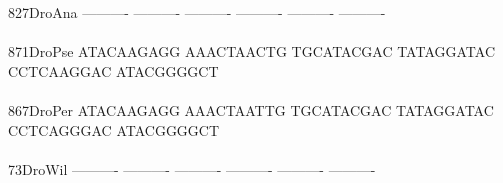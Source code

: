 \documentclass[11pt,twoside,reqno,a4paper]{article}
\begin{document}
{827\hspace*{2\charwidth}DroAna	----------	----------	----------	----------	----------	----------	\\
\hspace*{5\charwidth}\hspace*{7\charwidth}\hspace*{1\charwidth}\hspace*{1\charwidth}\hspace*{1\charwidth}\hspace*{1\charwidth}\hspace*{1\charwidth}\hspace*{1\charwidth}\\
871\hspace*{2\charwidth}DroPse	ATACAAGAGG	AAACTAACTG	TGCATACGAC	TATAGGATAC	CCTCAAGGAC	ATACGGGGCT	\\
\hspace*{5\charwidth}\hspace*{7\charwidth}\hspace*{1\charwidth}\hspace*{1\charwidth}\hspace*{1\charwidth}\hspace*{1\charwidth}\hspace*{1\charwidth}\hspace*{1\charwidth}\\
867\hspace*{2\charwidth}DroPer	ATACAAGAGG	AAACTAATTG	TGCATACGAC	TATAGGATAC	CCTCAGGGAC	ATACGGGGCT	\\
\hspace*{5\charwidth}\hspace*{7\charwidth}\hspace*{1\charwidth}\hspace*{1\charwidth}\hspace*{1\charwidth}\hspace*{1\charwidth}\hspace*{1\charwidth}\hspace*{1\charwidth}\\
73\hspace*{3\charwidth}DroWil	----------	----------	----------	----------	----------	----------	\\
\hspace*{5\charwidth}\hspace*{7\charwidth}\hspace*{1\charwidth}\hspace*{1\charwidth}\hspace*{1\charwidth}\hspace*{1\charwidth}\hspace*{1\charwidth}\hspace*{1\charwidth}\\
}
\end{document}
